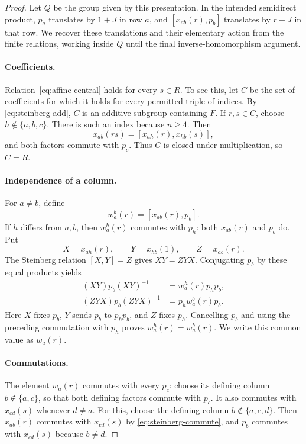 \begin{proof}
Let $Q$ be the group given by this presentation. In the intended
semidirect product, $p_a$ translates by $1+J$ in row $a$, and
$[x_{ab}(r),p_b]$ translates by $r+J$ in that row. We recover these
translations and their elementary action from the finite relations,
working inside $Q$ until the final inverse-homomorphism argument.

\paragraph{Coefficients.}
Relation~\eqref{eq:affine-central} holds for every $s\in R$.
To see this, let $C$ be the set of coefficients for which it holds
for every permitted triple of indices.  By
\eqref{eq:steinberg-add}, $C$ is an additive subgroup containing
$F$.  If $r,s\in C$, choose $h\notin\{a,b,c\}$.  There is such an
index because $n\geq4$.  Then
\[
 x_{ab}(rs)=[x_{ah}(r),x_{hb}(s)],
\]
and both factors commute with $p_c$.  Thus $C$ is closed under
multiplication, so $C=R$.

\paragraph{Independence of a column.}
For $a\ne b$, define
\[
 w_a^b(r)=[x_{ab}(r),p_b].
\]
If $h$ differs from $a,b$, then $w_a^b(r)$ commutes with $p_h$:
both $x_{ab}(r)$ and $p_b$ do.  Put
\[
 X=x_{ah}(r),\qquad Y=x_{hb}(1),\qquad Z=x_{ab}(r).
\]
The Steinberg relation $[X,Y]=Z$ gives $XY=ZYX$.
Conjugating $p_b$ by these equal products yields
\begin{align*}
 (XY)p_b(XY)^{-1}&=w_a^h(r)p_hp_b,\\
 (ZYX)p_b(ZYX)^{-1}&=p_hw_a^b(r)p_b.
\end{align*}
Here $X$ fixes $p_b$, $Y$ sends $p_b$ to $p_hp_b$, and $Z$ fixes
$p_h$.  Cancelling $p_b$ and using the preceding commutation with
$p_h$ proves $w_a^h(r)=w_a^b(r)$.  We write this common value as
$w_a(r)$.

\paragraph{Commutations.}
The element $w_a(r)$ commutes with every $p_c$: choose its defining
column $b\notin\{a,c\}$, so that both defining factors commute with
$p_c$.  It also commutes with $x_{cd}(s)$ whenever $d\ne a$.
For this, choose the defining column $b\notin\{a,c,d\}$.
Then $x_{ab}(r)$ commutes with $x_{cd}(s)$ by
\eqref{eq:steinberg-commute}, and $p_b$ commutes with $x_{cd}(s)$
because $b\ne d$.


\end{proof}
